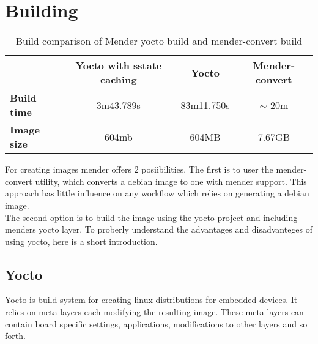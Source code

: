 \documentclass[../../main.tex]{subfiles}
\begin{document}
\section{Building}%
\label{sec:building}

\begin{table}[h]
	\centering
	\caption{Build comparison of Mender yocto build and mender-convert build}
	\label{tab:build_comp}
	\begin{tabular}{l|ccc}
		& \textbf{Yocto with sstate caching}& \textbf{Yocto} & \textbf{Mender-convert}\\
		\hline
		\textbf{Build time}&3m43.789s&83m11.750s& $\sim$ 20m \\
		\textbf{Image size}&604mb&604MB&7.67GB\\
	\end{tabular}
\end{table}


For creating images mender offers 2 posiibilities.
The first is to user the mender-convert utility, which converts a debian image
to one with mender support. This approach has little influence on any workflow which relies
on generating a debian image.\\
The second option is to build the image using the yocto project and including menders yocto layer.
To proberly understand the advantages and disadvanteges of using yocto, here is a short introduction.

\subsection{Yocto}%
\label{sub:yocto}

Yocto is build system for creating linux distributions for embedded devices. It relies on meta-layers
each modifying the resulting image. These meta-layers can contain board specific settings,
applications, modifications to other layers and so forth.
\end{document}
